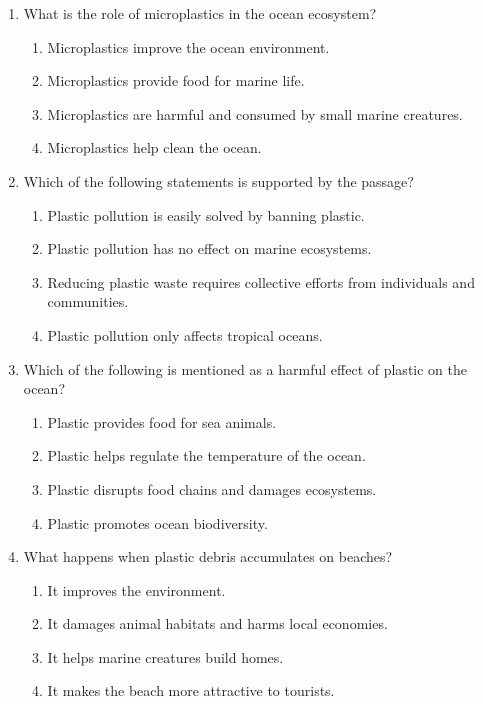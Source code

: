 \documentclass[12pt]{article}
\begin{document}
\begin{enumerate}
    \vspace{0.5cm}

    \item What is the role of microplastics in the ocean ecosystem?
    \begin{enumerate}[label=\Alph*.]
        \item Microplastics improve the ocean environment.
        \item Microplastics provide food for marine life.
        \item Microplastics are harmful and consumed by small marine creatures.
        \item Microplastics help clean the ocean.
    \end{enumerate}

    \vspace{0.5cm}

    \item Which of the following statements is supported by the passage?
    \begin{enumerate}[label=\Alph*.]
        \item Plastic pollution is easily solved by banning plastic.
        \item Plastic pollution has no effect on marine ecosystems.
        \item Reducing plastic waste requires collective efforts from individuals and communities.
        \item Plastic pollution only affects tropical oceans.
    \end{enumerate}

    \vspace{0.5cm}

    \item Which of the following is mentioned as a harmful effect of plastic on the ocean?
    \begin{enumerate}[label=\Alph*.]
        \item Plastic provides food for sea animals.
        \item Plastic helps regulate the temperature of the ocean.
        \item Plastic disrupts food chains and damages ecosystems.
        \item Plastic promotes ocean biodiversity.
    \end{enumerate}

    \vspace{0.5cm}

    \item What happens when plastic debris accumulates on beaches?
    \begin{enumerate}[label=\Alph*.]
        \item It improves the environment.
        \item It damages animal habitats and harms local economies.
        \item It helps marine creatures build homes.
        \item It makes the beach more attractive to tourists.
    \end{enumerate}


\end{enumerate}
\end{document}
